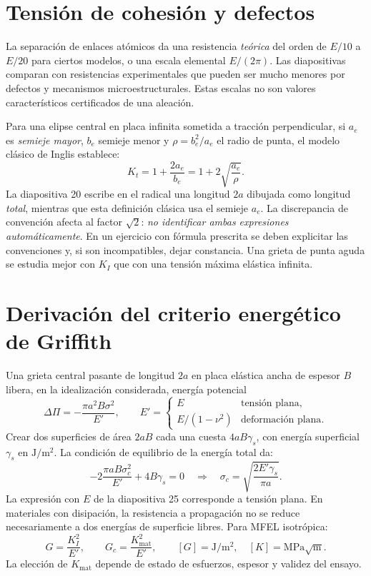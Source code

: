 \section{Tensión de cohesión y defectos}
La separación de enlaces atómicos da una resistencia \emph{teórica} del orden de $E/10$ a $E/20$ para ciertos modelos, o una escala elemental $E/(2\pi)$. Las diapositivas comparan con resistencias experimentales que pueden ser mucho menores por defectos y mecanismos microestructurales. Estas escalas no son valores característicos certificados de una aleación.

Para una elipse central en placa infinita sometida a tracción perpendicular, si $a_e$ es \emph{semieje mayor}, $b_e$ semieje menor y $\rho=b_e^2/a_e$ el radio de punta, el modelo clásico de Inglis establece:
\begin{equation}
K_t=1+\frac{2a_e}{b_e}=1+2\sqrt{\frac{a_e}{\rho}}.
\label{eq:clase-inglis}
\end{equation}
La diapositiva 20 escribe en el radical una longitud $2a$ dibujada como longitud \emph{total}, mientras que esta definición clásica usa el semieje $a_e$. La discrepancia de convención afecta al factor $\sqrt2$: \emph{no identificar ambas expresiones automáticamente}. En un ejercicio con fórmula prescrita se deben explicitar las convenciones y, si son incompatibles, dejar constancia. Una grieta de punta aguda se estudia mejor con $K_I$ que con una tensión máxima elástica infinita.

\section{Derivación del criterio energético de Griffith}
Una grieta central pasante de longitud $2a$ en placa elástica ancha de espesor $B$ libera, en la idealización considerada, energía potencial
\[
\Delta\Pi=-\frac{\pi a^2 B\sigma^2}{E'},\qquad
E'=\begin{cases}E&\text{tensión plana},\\ E/(1-\nu^2)&\text{deformación plana}.\end{cases}
\]
Crear dos superficies de área $2aB$ cada una cuesta $4aB\gamma_s$, con energía superficial $\gamma_s$ en $\mathrm{J/m^2}$. La condición de equilibrio de la energía total da:
\begin{equation}
-2\frac{\pi aB\sigma_c^2}{E'}+4B\gamma_s=0
\quad\Longrightarrow\quad
\sigma_c=\sqrt{\frac{2E'\gamma_s}{\pi a}}.
\label{eq:clase-griffith}
\end{equation}
La expresión con $E$ de la diapositiva 25 corresponde a tensión plana. En materiales con disipación, la resistencia a propagación no se reduce necesariamente a dos energías de superficie libres. Para MFEL isotrópica:
\[
G=\frac{K_I^2}{E'},\qquad
G_c=\frac{K_{\mathrm{mat}}^2}{E'},\qquad
[G]=\mathrm{J/m^2},\quad[K]=\mathrm{MPa}\sqrt{\mathrm m}.
\]
La elección de $K_{\mathrm{mat}}$ depende de estado de esfuerzos, espesor y validez del ensayo.

